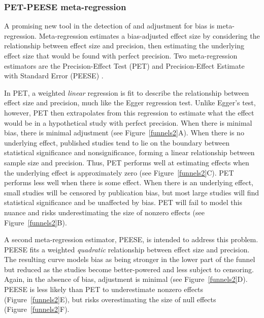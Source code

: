 \documentclass[man]{apa6}
\begin{document}
\subsubsection{PET-PEESE meta-regression}
A promising new tool in the detection of and adjustment for bias is meta-regression. Meta-regression estimates a bias-adjusted effect size by considering the relationship between effect size and precision, then estimating the underlying effect size that would be found with perfect precision. Two meta-regression estimators are the Precision-Effect Test (PET) and Precision-Effect Estimate with Standard Error (PEESE) \citep{Stanley:Doucouliagos:2014}. %

In PET, a weighted {\em linear} regression is fit to describe the relationship between effect size and precision, much like the Egger regression test. Unlike Egger's test, however, PET then extrapolates from this regression to estimate what the effect would be in a hypothetical study with perfect precision. When there is minimal bias, there is minimal adjustment (see Figure~\ref{funnels2}A). When there is no underlying effect, published studies tend to lie on the boundary between statistical significance and nonsignificance, forming a linear relationship between sample size and precision. Thus, PET performs well at estimating effects when the underlying effect is approximately zero (see Figure~\ref{funnels2}C). PET performs less well when there is some effect. When there is an underlying effect, small studies will be censored by publication bias, but most large studies will find statistical significance and be unaffected by bias. PET will fail to model this nuance and risks underestimating the size of nonzero effects (see Figure~\ref{funnels2}B).

A second meta-regression estimator, PEESE, is intended to address this problem. PEESE fits a weighted {\em quadratic} relationship between effect size and precision. The resulting curve models bias as being stronger in the lower part of the funnel but reduced as the studies become better-powered and less subject to censoring. Again, in the absence of bias, adjustment is minimal (see Figure~\ref{funnels2}D). PEESE is less likely than PET to underestimate nonzero effects (Figure~\ref{funnels2}E), but risks overestimating the size of null effects (Figure~\ref{funnels2}F).
\end{document}

